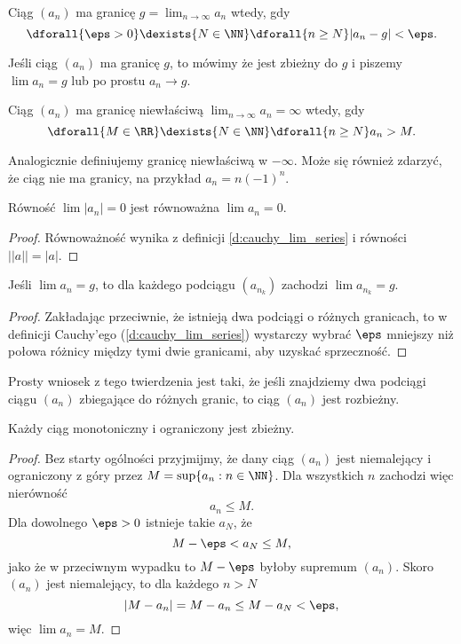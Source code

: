 \begin{definition}
    \label{d:cauchy_lim_series}
    Ciąg $(a_n)$ ma granicę $g = \displaystyle\lim_{n\to\infty} a_n$ wtedy, gdy
    \[ \dforall{\eps > 0} \dexists{N \in\NN} \dforall{n\geq N} |a_n - g| < \eps. \]
\end{definition}

Jeśli ciąg $(a_n)$ ma granicę $g$, to mówimy że jest zbieżny do $g$ i piszemy $\lim a_n = g$ lub po prostu $a_n \to g$.

\begin{definition}
    Ciąg $(a_n)$ ma granicę niewłaściwą $\displaystyle\lim_{n\to\infty} a_n = \infty$ wtedy, gdy
    \[ \dforall{M\in\RR} \dexists{N\in\NN} \dforall{n\geq N} a_n > M. \]
\end{definition}

Analogicznie definiujemy granicę niewłaściwą w $-\infty$. Może się również zdarzyć, że ciąg nie ma granicy, na przykład $a_n = n(-1)^n$.

\begin{fact}
    Równość $\lim |a_n| = 0$ jest równoważna $\lim a_n = 0$.
\end{fact}
\begin{proof}
    Równoważność wynika z definicji \ref{d:cauchy_lim_series} i równości $\left||a|\right| = |a|$.
\end{proof}

\begin{theorem}
    \label{t:lim_subsequence=lim_sequence}
    Jeśli $\lim a_n = g$, to dla każdego podciągu $(a_{n_k})$ zachodzi $\lim a_{n_k} = g$.
\end{theorem}
\begin{proof}
    Zakładając przeciwnie, że istnieją dwa podciągi o różnych granicach, to w definicji Cauchy'ego (\ref{d:cauchy_lim_series}) wystarczy wybrać $\eps$ mniejszy niż połowa różnicy między tymi dwie granicami, aby uzyskać sprzeczność.
\end{proof}

Prosty wniosek z tego twierdzenia jest taki, że jeśli znajdziemy dwa podciągi ciągu $(a_n)$ zbiegające do różnych granic, to ciąg $(a_n)$ jest rozbieżny.

\begin{theorem}
    \label{t:sequence monotonic and bounded}
    Każdy ciąg monotoniczny i ograniczony jest zbieżny.
\end{theorem}
\begin{proof}
    Bez starty ogólności przyjmijmy, że dany ciąg $(a_n)$ jest niemalejący i ograniczony z góry przez $M = \sup\{a_n : n \in \NN\}$. Dla wszystkich $n$ zachodzi więc nierówność
    \[ a_n \leq M. \]
    Dla dowolnego $\eps > 0$ istnieje takie $a_N$, że
    \[ M - \eps < a_N \leq M, \]
    jako że w przeciwnym wypadku to $M - \eps$ byłoby supremum $(a_n)$. Skoro $(a_n)$ jest niemalejący, to dla każdego $n > N$
    \[ |M - a_n| = M - a_n \leq M - a_N < \eps, \]
    więc $\lim a_n = M$.
\end{proof}

